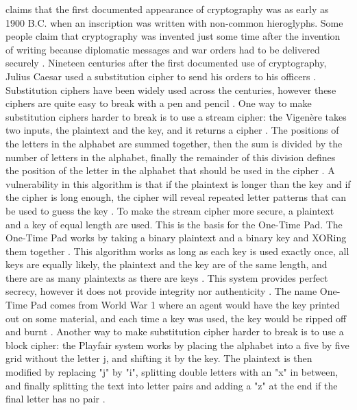 \documentclass{l4proj}
\begin{document}
\citet{kessler_overview_2016} claims that the first documented appearance of cryptography was as early as 1900 B.C. when an inscription was written with non-common hieroglyphs.
Some people claim that cryptography was invented just some time after the invention of writing because diplomatic messages and war orders had to be delivered securely 
\citep{kessler_overview_2016}. Nineteen centuries after the first documented use of cryptography, Julius Caesar used a substitution cipher to send his orders to his officers 
\citep{anderson_security_2008}. Substitution ciphers have been widely used across the centuries, however these ciphers are quite easy to break with a pen and pencil 
\citep{anderson_security_2008}. One way to make substitution ciphers harder to break is to use a stream cipher: the Vigenère takes two inputs, the plaintext and the key, and it
returns a cipher \citep{anderson_security_2008}. The positions of the letters in the alphabet are summed together, then the sum is divided by the number of letters in the alphabet, 
finally the remainder of this division defines the position of the letter in the alphabet that should be used in the cipher \citep{anderson_security_2008}. 
A vulnerability in this algorithm is that if the plaintext is longer than the key and if the cipher is long enough, the cipher will reveal repeated letter patterns 
that can be used to guess the key \citep{anderson_security_2008}. To make the stream cipher more secure, a plaintext and a key of equal length are used. 
This is the basis for the One-Time Pad. The One-Time Pad works by taking a binary plaintext and a binary key and XORing them together \citep{savage_cse_2019}.
This algorithm works as long as each key is used exactly once, all keys are equally likely, the plaintext and the key are of the same length, and there are as many plaintexts 
as there are keys \citep{savage_cse_2019} \citep{anderson_security_2008}. This system provides perfect secrecy, however it does not provide integrity nor authenticity 
\citep{savage_cse_2019}. The name One-Time Pad comes from World War 1 where an agent would have the key printed out on some material, and each time a key was used, the key would
be ripped off and burnt \citep{anderson_security_2008}. Another way to make substitution cipher harder to break is to use a block cipher: the Playfair system works by placing the
alphabet into a five by five grid without the letter j, and shifting it by the key. The plaintext is then modified by replacing "j" by "i", 
splitting double letters with an "x" in between, and finally splitting the text into letter pairs and adding a "z" at the end if the final letter has no pair \citep{anderson_security_2008}.
\end{document}
